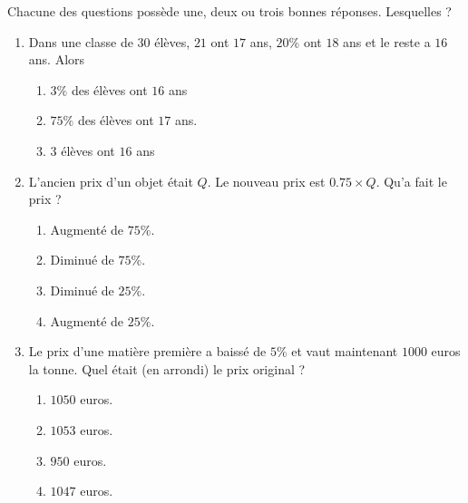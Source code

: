 
\begin{exercice}\label{exosmath-0289}

    Chacune des questions possède une, deux ou trois bonnes réponses. Lesquelles ?
    \begin{multicols}{2}
    \begin{enumerate}

        \item
        Dans une classe de \( 30\) élèves, \( 21\) ont \( 17\) ans, \( 20\%\) ont \( 18\) ans et le reste a \( 16\) ans.  Alors
        \begin{enumerate}
            \item

         \( 3\%\) des élèves ont \( 16\) ans
     \item
         \( 75\%\) des élèves ont \( 17\) ans.
     \item
         \( 3\) élèves ont \( 16\) ans
                
        \end{enumerate}

    \item
        L'ancien prix d'un objet était \( Q\). Le nouveau prix est \( 0.75\times Q\). Qu'a fait le prix ?
        \begin{enumerate}
            \item
                Augmenté de \( 75\%\).
            \item
                Diminué de \( 75\%\).
            \item
                Diminué de \( 25\%\).
            \item
                Augmenté de \( 25\%\).
        \end{enumerate}

    \item
        Le prix d'une matière première a baissé de \( 5\%\) et vaut maintenant \( 1000\) euros la tonne. Quel était (en arrondi) le prix original ?
        \begin{enumerate}
            \item
                \( 1050\) euros.
            \item
                \( 1053\) euros.
            \item
                \( 950\) euros.
            \item
                \( 1047\) euros.
        \end{enumerate}

    \end{enumerate}
    \end{multicols}
       
\end{exercice}
